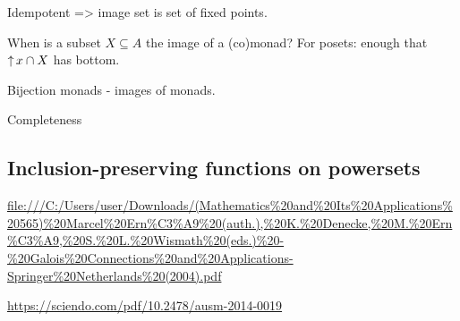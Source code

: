 Idempotent => image set is set of fixed points.

\begin{proposition}
When is a subset $X\subseteq A$ the image of a (co)monad? For posets: enough that $\operatorname{\uparrow} x \cap X$ has bottom.
\end{proposition}

\begin{proposition}
Bijection monads - images of monads.
\end{proposition}

\begin{definition}
Completeness
\end{definition}

\subsection{Inclusion-preserving functions on powersets}
\url{file:///C:/Users/user/Downloads/(Mathematics%20and%20Its%20Applications%20565)%20Marcel%20Ern%C3%A9%20(auth.),%20K.%20Denecke,%20M.%20Ern%C3%A9,%20S.%20L.%20Wismath%20(eds.)%20-%20Galois%20Connections%20and%20Applications-Springer%20Netherlands%20(2004).pdf}

\url{https://sciendo.com/pdf/10.2478/ausm-2014-0019}

